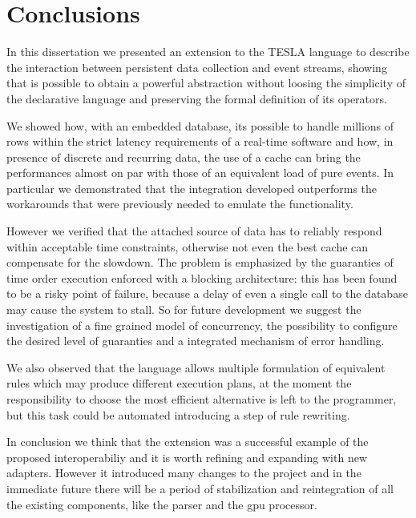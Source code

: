 \chapter*{Conclusions}


In this dissertation we presented an extension to the TESLA language to describe the interaction between persistent data collection and event streams, showing that is possible to obtain a powerful abstraction without loosing the simplicity of the declarative language and preserving the formal definition of its operators.

We showed how, with an embedded database, its possible to handle millions of rows within the strict latency requirements of a real-time software and how, in presence of discrete and recurring data, the use of a cache can bring the performances almost on par with those of an equivalent load of pure events. In particular we demonstrated that the integration developed outperforms the workarounds that were previously needed to emulate the functionality.

However we verified that the attached source of data has to reliably respond within acceptable time constraints, otherwise not even the best cache can compensate for the slowdown. The problem is emphasized by the guaranties of time order execution enforced with a blocking architecture: this has been found to be a risky point of failure, because a delay of even a single call to the database may cause the system to stall. So for future development we suggest the investigation of a fine grained model of concurrency, the possibility to configure the desired level of guaranties and a integrated mechanism of error handling.

We also observed that the language allows multiple formulation of equivalent rules which may produce different execution plans, at the moment the responsibility to choose the most efficient alternative is left to the programmer, but this task could be automated introducing a step of rule rewriting.

In conclusion we think that the extension was a successful example of the proposed interoperabiliy and it is worth refining and expanding with new adapters. However it introduced many changes to the project and in the immediate future there will be a period of stabilization and reintegration of all the existing components, like the parser and the gpu processor.